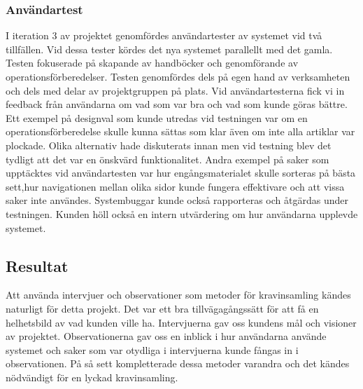 
\subsubsection{Användartest}
I iteration 3 av projektet genomfördes användartester av systemet vid två tillfällen. Vid dessa tester kördes det nya systemet parallellt med det gamla. Testen fokuserade på skapande av handböcker och genomförande av operationsförberedelser. Testen genomfördes dels på egen hand av verksamheten och dels med delar av projektgruppen på plats. Vid användartesterna fick vi in feedback från användarna om vad som var bra och vad som kunde göras bättre. Ett exempel på designval som kunde utredas vid testningen var om en operationsförberedelse skulle kunna sättas som klar även om inte alla artiklar var plockade. Olika alternativ hade diskuterats innan men vid testning blev det tydligt att det var en önskvärd funktionalitet. Andra exempel på saker som upptäcktes vid användartesten var hur engångsmaterialet skulle sorteras på bästa sett,hur navigationen mellan olika sidor kunde fungera effektivare och att vissa saker inte användes.
Systembuggar kunde också rapporteras och åtgärdas under testningen.
Kunden höll också en intern utvärdering om hur användarna upplevde systemet.


\subsection{Resultat}
Att använda intervjuer och observationer som metoder för kravinsamling kändes naturligt för detta projekt. Det var ett bra tillvägagångssätt för att få en helhetsbild av vad kunden ville ha. Intervjuerna gav oss kundens mål och visioner av projektet. Observationerna gav oss en inblick i hur användarna använde systemet och saker som var otydliga i intervjuerna kunde fångas in i observationen. På så sett kompletterade dessa metoder varandra och det kändes nödvändigt för en lyckad kravinsamling.

